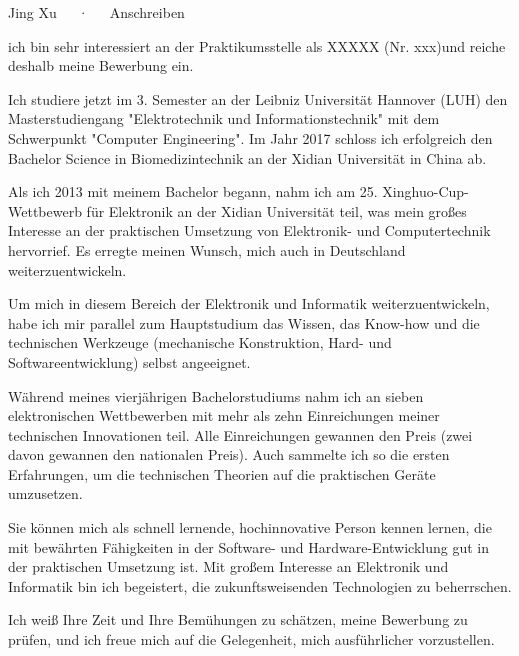 \documentclass[11pt, a4paper]{awesome-cv}
\providecommand{\applicatename}{XXXXX (Nr. xxx)}
\begin{document}
\makecvheader[R]

\makecvfooter
  {}
  {Jing Xu~~~·~~~Anschreiben}
  {}

\makelettertitle

\begin{cvletter}


ich bin sehr interessiert an der Praktikumsstelle als \applicatename und reiche deshalb meine Bewerbung ein.

Ich studiere jetzt im 3. Semester an der Leibniz Universität Hannover (LUH) den Masterstudiengang "Elektrotechnik und Informationstechnik" mit dem Schwerpunkt "Computer Engineering". Im Jahr 2017 schloss ich erfolgreich den Bachelor Science in Biomedizintechnik an der Xidian Universität in China ab.

Als ich 2013 mit meinem Bachelor begann, nahm ich am 25. Xinghuo-Cup-Wettbewerb für Elektronik an der Xidian Universität teil, was mein großes Interesse an der praktischen Umsetzung von Elektronik- und Computertechnik hervorrief. Es erregte meinen Wunsch, mich auch in Deutschland weiterzuentwickeln.

Um mich in diesem Bereich der Elektronik und Informatik weiterzuentwickeln, habe ich mir parallel zum Hauptstudium das Wissen, das Know-how und die technischen Werkzeuge (mechanische Konstruktion, Hard- und Softwareentwicklung) selbst angeeignet.

Während meines vierjährigen Bachelorstudiums nahm ich an sieben elektronischen Wettbewerben mit mehr als zehn Einreichungen meiner technischen Innovationen teil. Alle Einreichungen gewannen den Preis (zwei davon gewannen den nationalen Preis). Auch sammelte ich so die ersten Erfahrungen, um die technischen Theorien auf die praktischen Geräte umzusetzen.

Sie können mich als schnell lernende, hochinnovative Person kennen lernen, die mit bewährten Fähigkeiten in der Software- und Hardware-Entwicklung gut in der praktischen Umsetzung ist. Mit großem Interesse an Elektronik und Informatik bin ich begeistert, die zukunftsweisenden Technologien zu beherrschen.

Ich weiß Ihre Zeit und Ihre Bemühungen zu schätzen, meine Bewerbung zu prüfen, und ich freue mich auf die Gelegenheit, mich ausführlicher vorzustellen.\\\\



\end{cvletter}


\makeletterclosing
\end{document}
